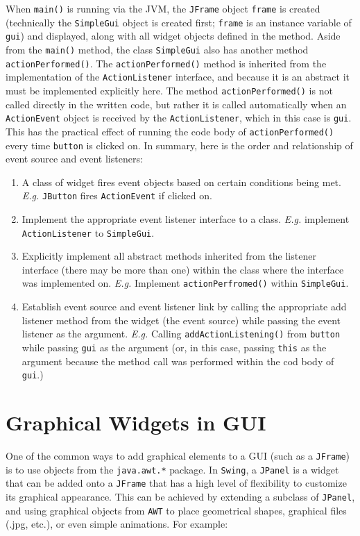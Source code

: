\documentclass{tufte-handout}
\begin{document}
    When \texttt{main()} is running via the JVM, the \texttt{JFrame} object \texttt{frame} is created (technically the \texttt{SimpleGui} object is created first; \texttt{frame} is an instance variable of \texttt{gui}) and displayed, along with all widget objects defined in the method. Aside from the \texttt{main()} method, the class \texttt{SimpleGui} also has another method \texttt{actionPerformed()}. The \texttt{actionPerformed()} method is inherited from the implementation of the \texttt{ActionListener} interface, and because it is an abstract it must be implemented explicitly here. The method \texttt{actionPerformed()} is not called directly in the written code, but rather it is called automatically when an \texttt{ActionEvent} object is received by the \texttt{ActionListener}, which in this case is \texttt{gui}. This has the practical effect of running the code body of \texttt{actionPerformed()} every time \texttt{button} is clicked on. In summary, here is the order and relationship of event source and event listeners:

    \begin{enumerate}
        \item A class of widget fires event objects based on certain conditions being met. \textit{E.g.} \texttt{JButton} fires \texttt{ActionEvent} if clicked on.
        \item Implement the appropriate event listener interface to a class. \textit{E.g.} implement \texttt{ActionListener} to \texttt{SimpleGui}.
        \item Explicitly implement all abstract methods inherited from the listener interface (there may be more than one) within the class where the interface was implemented on. \textit{E.g.} Implement \texttt{actionPerfromed()} within \texttt{SimpleGui}.
        \item Establish event source and event listener link by calling the appropriate add listener method from the widget (the event source) while passing the event listener as the argument. \textit{E.g.} Calling \texttt{addActionListening()} from \texttt{button} while passing \texttt{gui} as the argument (or, in this case, passing \texttt{this} as the argument because the method call was performed within the cod body of \texttt{gui}.)
    \end{enumerate}

    \section*{Graphical Widgets in GUI}
    One of the common ways to add graphical elements to a GUI (such as a \texttt{JFrame}) is to use objects from the \texttt{java.awt.*} package. In \texttt{Swing}, a \texttt{JPanel} is a widget that can be added onto a \texttt{JFrame} that has a high level of flexibility to customize its graphical appearance. This can be achieved by extending a subclass of \texttt{JPanel}, and using graphical objects from \texttt{AWT} to place geometrical shapes, graphical files (.jpg, etc.), or even simple animations. For example:
\end{document}
